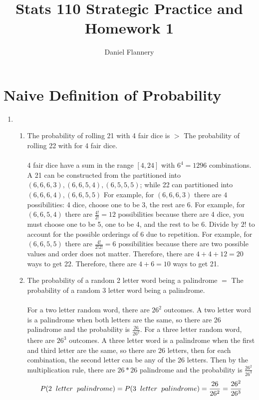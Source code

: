 \documentclass[11pt, oneside]{article}   	%
\title{Stats 110 Strategic Practice and Homework 1}
\author{Daniel Flannery}
\begin{document}
\maketitle
\section{Naive Definition of Probability}					%
	\begin{enumerate}
		\item 
			\begin{enumerate}
			\item The probability of rolling 21  with 4 fair dice is $>$ The probability of rolling 22 with for 4 fair dice.\\\\
			4 fair dice have a sum in the range $[4, 24]$ with $6^4 = 1296$ combinations.
			A 21 can be constructed from the partitioned into $(6, 6, 6, 3), (6, 6, 5, 4), (6, 5, 5, 5)$; while 22 can partitioned into $(6, 6, 6, 4), (6, 6, 5, 5)$
			For example, for $(6, 6, 6, 3)$ there are $4$ possibilities: 4 dice, choose one to be 3, the rest are 6.
			For example, for $(6, 6, 5, 4)$ there are $\frac{4!}{2!} = 12$ possibilities because there are 4 dice, you must choose one to be 5, one to be 4, and the rest to be 6. Divide by $2!$ to account for the possible orderings of 6 due to repetition.
			For example, for $(6, 6, 5, 5)$ there are $\frac{4!}{2! 2!} = 6$ possibilities because there are two possible values and order does not matter.
			Therefore, there are $4 + 4 + 12 = 20$ ways to get 22.
			Therefore, there are $4 + 6 = 10$ ways to get 21.
			\item The probability of a random 2 letter word being a palindrome $=$ The probability of a random 3 letter word being a palindrome.\\\\
			For a two letter random word, there are $26^2$ outcomes. A two letter word is a palindrome when both letters are the same, so there are 26 palindrome and the probability is $\frac{26}{26^2}$.
			For a three letter random word, there are $26^3$ outcomes. A three letter word is a palindrome when the first and third letter are the same, so there are 26 letters, then for each combination, the second letter can be any of the 26 letters.
			Then by the multiplication rule, there are $26 * 26$ palindrome and the probability is $\frac{26^2}{26^3}$
			\[ P(2 \hspace{2mm} letter \hspace{2mm} palindrome) = P(3 \hspace{2mm} letter \hspace{2mm} palindrome) = \frac{26}{26^2} = \frac{26^2}{26^3} \]

\end{enumerate}
\end{enumerate}
\end{document}
